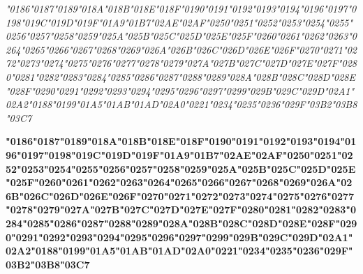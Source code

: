 {\LibertinusSerifPatch\itshape 
	\char"0186\gs \char"0187\gs \char"0189\gs \char"018A\gs \char"018B\gs \char"018E\gs \char"018F\gs \char"0190\gs \char"0191\gs \char"0192\gs \char"0193\gs \char"0194\gs \char"0196\gs \char"0197\gs \char"0198\gs \char"019C\gs \char"019D\gs \char"019F\gs \char"01A9\gs \char"01B7\gs \char"02AE\gs \char"02AF\gs \char"0250\gs \char"0251\gs \char"0252\gs \char"0253\gs \char"0254\gs \char"0255\gs \char"0256\gs \char"0257\gs \char"0258\gs \char"0259\gs \char"025A\gs \char"025B\gs \char"025C\gs \char"025D\gs \char"025E\gs \char"025F\gs \char"0260\gs \char"0261\gs \char"0262\gs \char"0263\gs \char"0264\gs \char"0265\gs \char"0266\gs \char"0267\gs \char"0268\gs \char"0269\gs \char"026A\gs \char"026B\gs \char"026C\gs \char"026D\gs \char"026E\gs \char"026F\gs \char"0270\gs \char"0271\gs \char"0272\gs \char"0273\gs \char"0274\gs \char"0275\gs \char"0276\gs \char"0277\gs \char"0278\gs \char"0279\gs \char"027A\gs \char"027B\gs \char"027C\gs \char"027D\gs \char"027E\gs \char"027F\gs \char"0280\gs \char"0281\gs \char"0282\gs \char"0283\gs \char"0284\gs \char"0285\gs \char"0286\gs \char"0287\gs \char"0288\gs \char"0289\gs \char"028A\gs \char"028B\gs \char"028C\gs \char"028D\gs \char"028E\gs \char"028F\gs \char"0290\gs \char"0291\gs \char"0292\gs \char"0293\gs \char"0294\gs \char"0295\gs \char"0296\gs \char"0297\gs \char"0299\gs \char"029B\gs \char"029C\gs \char"029D\gs \char"02A1\gs \char"02A2\gs \char"0188\gs \char"0199\gs \char"01A5\gs \char"01AB\gs \char"01AD\gs \char"02A0\gs \char"0221\gs \char"0234\gs \char"0235\gs \char"0236\gs \char"029F\gs \char"03B2\gs \char"03B8\gs \char"03C7\gs
}

{\LibertinusSerifPatch\bfseries 
	\char"0186\gs \char"0187\gs \char"0189\gs \char"018A\gs \char"018B\gs \char"018E\gs \char"018F\gs \char"0190\gs \char"0191\gs \char"0192\gs \char"0193\gs \char"0194\gs \char"0196\gs \char"0197\gs \char"0198\gs \char"019C\gs \char"019D\gs \char"019F\gs \char"01A9\gs \char"01B7\gs \char"02AE\gs \char"02AF\gs \char"0250\gs \char"0251\gs \char"0252\gs \char"0253\gs \char"0254\gs \char"0255\gs \char"0256\gs \char"0257\gs \char"0258\gs \char"0259\gs \char"025A\gs \char"025B\gs \char"025C\gs \char"025D\gs \char"025E\gs \char"025F\gs \char"0260\gs \char"0261\gs \char"0262\gs \char"0263\gs \char"0264\gs \char"0265\gs \char"0266\gs \char"0267\gs \char"0268\gs \char"0269\gs \char"026A\gs \char"026B\gs \char"026C\gs \char"026D\gs \char"026E\gs \char"026F\gs \char"0270\gs \char"0271\gs \char"0272\gs \char"0273\gs \char"0274\gs \char"0275\gs \char"0276\gs \char"0277\gs \char"0278\gs \char"0279\gs \char"027A\gs \char"027B\gs \char"027C\gs \char"027D\gs \char"027E\gs \char"027F\gs \char"0280\gs \char"0281\gs \char"0282\gs \char"0283\gs \char"0284\gs \char"0285\gs \char"0286\gs \char"0287\gs \char"0288\gs \char"0289\gs \char"028A\gs \char"028B\gs \char"028C\gs \char"028D\gs \char"028E\gs \char"028F\gs \char"0290\gs \char"0291\gs \char"0292\gs \char"0293\gs \char"0294\gs \char"0295\gs \char"0296\gs \char"0297\gs \char"0299\gs \char"029B\gs \char"029C\gs \char"029D\gs \char"02A1\gs \char"02A2\gs \char"0188\gs \char"0199\gs \char"01A5\gs \char"01AB\gs \char"01AD\gs \char"02A0\gs \char"0221\gs \char"0234\gs \char"0235\gs \char"0236\gs \char"029F\gs \char"03B2\gs \char"03B8\gs \char"03C7\gs
}

